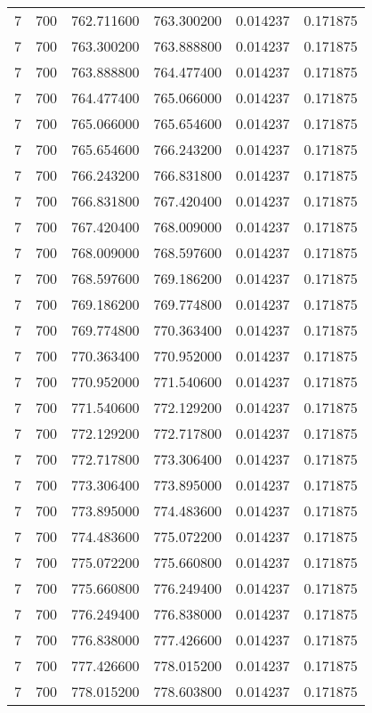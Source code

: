 \begin{longtable}{rrrrrr}
7 & 700 & 762.711600 & 763.300200 & 0.014237 & 0.171875 \\
7 & 700 & 763.300200 & 763.888800 & 0.014237 & 0.171875 \\
7 & 700 & 763.888800 & 764.477400 & 0.014237 & 0.171875 \\
7 & 700 & 764.477400 & 765.066000 & 0.014237 & 0.171875 \\
7 & 700 & 765.066000 & 765.654600 & 0.014237 & 0.171875 \\
7 & 700 & 765.654600 & 766.243200 & 0.014237 & 0.171875 \\
7 & 700 & 766.243200 & 766.831800 & 0.014237 & 0.171875 \\
7 & 700 & 766.831800 & 767.420400 & 0.014237 & 0.171875 \\
7 & 700 & 767.420400 & 768.009000 & 0.014237 & 0.171875 \\
7 & 700 & 768.009000 & 768.597600 & 0.014237 & 0.171875 \\
7 & 700 & 768.597600 & 769.186200 & 0.014237 & 0.171875 \\
7 & 700 & 769.186200 & 769.774800 & 0.014237 & 0.171875 \\
7 & 700 & 769.774800 & 770.363400 & 0.014237 & 0.171875 \\
7 & 700 & 770.363400 & 770.952000 & 0.014237 & 0.171875 \\
7 & 700 & 770.952000 & 771.540600 & 0.014237 & 0.171875 \\
7 & 700 & 771.540600 & 772.129200 & 0.014237 & 0.171875 \\
7 & 700 & 772.129200 & 772.717800 & 0.014237 & 0.171875 \\
7 & 700 & 772.717800 & 773.306400 & 0.014237 & 0.171875 \\
7 & 700 & 773.306400 & 773.895000 & 0.014237 & 0.171875 \\
7 & 700 & 773.895000 & 774.483600 & 0.014237 & 0.171875 \\
7 & 700 & 774.483600 & 775.072200 & 0.014237 & 0.171875 \\
7 & 700 & 775.072200 & 775.660800 & 0.014237 & 0.171875 \\
7 & 700 & 775.660800 & 776.249400 & 0.014237 & 0.171875 \\
7 & 700 & 776.249400 & 776.838000 & 0.014237 & 0.171875 \\
7 & 700 & 776.838000 & 777.426600 & 0.014237 & 0.171875 \\
7 & 700 & 777.426600 & 778.015200 & 0.014237 & 0.171875 \\
7 & 700 & 778.015200 & 778.603800 & 0.014237 & 0.171875 \\

\end{longtable}
